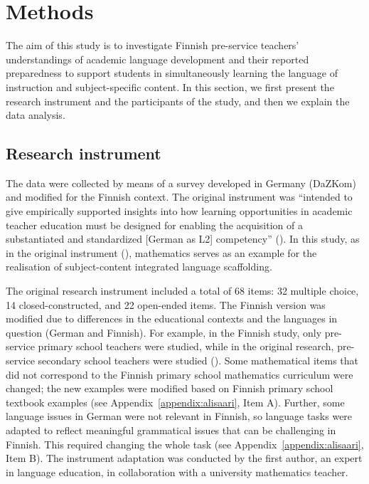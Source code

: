 \documentclass[output=paper]{langscibook}
\begin{document}
\section{Methods}\label{sec:alisaari:3} %
\largerpage[-2]
The aim of this study is to investigate Finnish pre-service teachers’ understandings of academic language development and their reported preparedness to support students in simultaneously learning the language of instruction and subject-specific content. In this section, we first present the research instrument and the participants of the study, and then we explain the data analysis. 

\subsection{Research instrument}\label{sec:alisaari:3.1} %

The data were collected by means of a survey developed in Germany (DaZKom) and modified for the Finnish context. The original instrument was “intended to give empirically supported insights into how learning opportunities in academic teacher education must be designed for enabling the acquisition of a substantiated and standardized [German as L2] competency” (\citealt{CarlsonEtAl2018}). In this study, as in the original instrument (\citealt{CarlsonEtAl2018}), mathematics serves as an example for the realisation of subject-content integrated language scaffolding.

The original research instrument included a total of 68 items: 32 multiple choice, 14 closed-constructed, and 22 open-ended items. The Finnish version was modified due to differences in the educational contexts and the languages in question (German and Finnish). For example, in the Finnish study, only pre-service primary school teachers were studied, while in the original research, pre-service secondary school teachers were studied (\citealt{CarlsonEtAl2018}). Some mathematical items that did not correspond to the Finnish primary school mathematics curriculum were changed; the new examples were modified based on Finnish primary school textbook examples (see Appendix~\ref{appendix:alisaari}, Item A). Further, some language issues in German were not relevant in Finnish, so language tasks were adapted to reflect meaningful grammatical issues that can be challenging in Finnish. This required changing the whole task (see Appendix~\ref{appendix:alisaari}, Item B). The instrument adaptation was conducted by the first author, an expert in language education, in collaboration with a university mathematics teacher.
\end{document}

